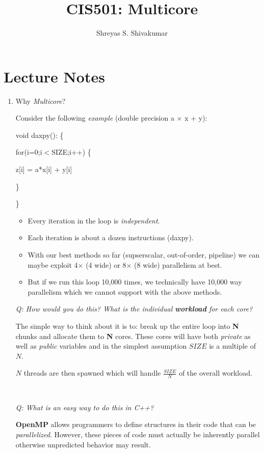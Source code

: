 \documentclass[12pt]{article}
\title{CIS501: Multicore}
\author[1]{Shreyas S. Shivakumar}
\newenvironment{QandA}{\begin{enumerate}[label=\bfseries\arabic*.]\bfseries}
                      {\end{enumerate}}
\newenvironment{answered}{\par\quad\normalfont}{}
\begin{document}
\maketitle

\section{Lecture Notes}

\begin{QandA}
\item Why \textit{Multicore}?
\begin{answered}
Consider the following \textit{example} (double precision a $\times$ x + y):

\quad \quad \quad void daxpy(): \{

\quad \quad \quad \quad for(i=0;i$<$SIZE;i++) \{

\quad \quad \quad \quad \quad z[i] = a*x[i] + y[i]

\quad \quad \quad \quad \}

\quad \quad \quad \}

\begin{itemize}
    \item Every iteration in the loop is \textit{independent}.
    \item Each iteration is about a dozen instructions (daxpy).
    \item With our best methods so far (supserscalar, out-of-order, pipeline) we can maybe exploit 4$\times$ (4 wide) or 8$\times$ (8 wide) parallelism at best.
    \item But if we run this loop 10,000 times, we technically have 10,000 way parallelism which we cannot support with the above methods.
\end{itemize}

\textit{Q: How would you do this? What is the individual \textbf{workload} for each core?}

\quad The simple way to think about it is to: break up the entire loop into \textbf{N} chunks and allocate them to \textbf{N} cores. These cores will have both \textit{private} as well as \textit{public} variables and in the simplest assumption $SIZE$ is a multiple of $N$.

\quad $N$ threads are then spawned which will handle $\frac{SIZE}{N}$ of the overall workload. 

\ 

\textit{Q: What is an easy way to do this in C++?}

\quad \textbf{OpenMP} allows programmers to define structures in their code that can be \textit{parallelized}. However, these pieces of code must actually be inherently parallel otherwise unpredicted behavior may result. 
\end{answered}


\end{QandA}
\end{document}
